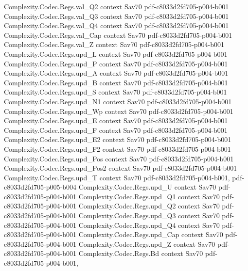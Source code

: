 \begin{theorem}
  {Complexity.Codec.Regs.val_Q2}
  {context}
  {Sav70}
  {pdf-c8033d2fd705-p004-b001}
\proofstep
  {Complexity.Codec.Regs.val_Q3}
  {context}
  {Sav70}
  {pdf-c8033d2fd705-p004-b001}
\proofstep
  {Complexity.Codec.Regs.val_Q4}
  {context}
  {Sav70}
  {pdf-c8033d2fd705-p004-b001}
\proofstep
  {Complexity.Codec.Regs.val_Cap}
  {context}
  {Sav70}
  {pdf-c8033d2fd705-p004-b001}
\proofstep
  {Complexity.Codec.Regs.val_Z}
  {context}
  {Sav70}
  {pdf-c8033d2fd705-p004-b001}
\proofstep
  {Complexity.Codec.Regs.upd_L}
  {context}
  {Sav70}
  {pdf-c8033d2fd705-p004-b001}
\proofstep
  {Complexity.Codec.Regs.upd_P}
  {context}
  {Sav70}
  {pdf-c8033d2fd705-p004-b001}
\proofstep
  {Complexity.Codec.Regs.upd_A}
  {context}
  {Sav70}
  {pdf-c8033d2fd705-p004-b001}
\proofstep
  {Complexity.Codec.Regs.upd_B}
  {context}
  {Sav70}
  {pdf-c8033d2fd705-p004-b001}
\proofstep
  {Complexity.Codec.Regs.upd_S}
  {context}
  {Sav70}
  {pdf-c8033d2fd705-p004-b001}
\proofstep
  {Complexity.Codec.Regs.upd_N1}
  {context}
  {Sav70}
  {pdf-c8033d2fd705-p004-b001}
\proofstep
  {Complexity.Codec.Regs.upd_Wp}
  {context}
  {Sav70}
  {pdf-c8033d2fd705-p004-b001}
\proofstep
  {Complexity.Codec.Regs.upd_E}
  {context}
  {Sav70}
  {pdf-c8033d2fd705-p004-b001}
\proofstep
  {Complexity.Codec.Regs.upd_F}
  {context}
  {Sav70}
  {pdf-c8033d2fd705-p004-b001}
\proofstep
  {Complexity.Codec.Regs.upd_E2}
  {context}
  {Sav70}
  {pdf-c8033d2fd705-p004-b001}
\proofstep
  {Complexity.Codec.Regs.upd_F2}
  {context}
  {Sav70}
  {pdf-c8033d2fd705-p004-b001}
\proofstep
  {Complexity.Codec.Regs.upd_Pos}
  {context}
  {Sav70}
  {pdf-c8033d2fd705-p004-b001}
\proofstep
  {Complexity.Codec.Regs.upd_Pos2}
  {context}
  {Sav70}
  {pdf-c8033d2fd705-p004-b001}
\proofstep
  {Complexity.Codec.Regs.upd_T}
  {context}
  {Sav70}
  {pdf-c8033d2fd705-p004-b001,
    pdf-c8033d2fd705-p005-b004}
\proofstep
  {Complexity.Codec.Regs.upd_U}
  {context}
  {Sav70}
  {pdf-c8033d2fd705-p004-b001}
\proofstep
  {Complexity.Codec.Regs.upd_Q1}
  {context}
  {Sav70}
  {pdf-c8033d2fd705-p004-b001}
\proofstep
  {Complexity.Codec.Regs.upd_Q2}
  {context}
  {Sav70}
  {pdf-c8033d2fd705-p004-b001}
\proofstep
  {Complexity.Codec.Regs.upd_Q3}
  {context}
  {Sav70}
  {pdf-c8033d2fd705-p004-b001}
\proofstep
  {Complexity.Codec.Regs.upd_Q4}
  {context}
  {Sav70}
  {pdf-c8033d2fd705-p004-b001}
\proofstep
  {Complexity.Codec.Regs.upd_Cap}
  {context}
  {Sav70}
  {pdf-c8033d2fd705-p004-b001}
\proofstep
  {Complexity.Codec.Regs.upd_Z}
  {context}
  {Sav70}
  {pdf-c8033d2fd705-p004-b001}
\proofstep
  {Complexity.Codec.Regs.Bd}
  {context}
  {Sav70}
  {pdf-c8033d2fd705-p004-b001,
}
\end{theorem}
